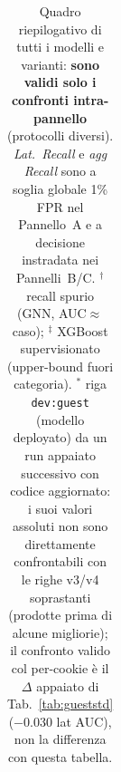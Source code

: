 \begin{table}[ht!]
{\begin{tabular}{l c c c c c c}
    \bottomrule
    \end{tabular}
}
\caption{Quadro riepilogativo di tutti i modelli e varianti: \textbf{sono validi solo i confronti intra-pannello} (protocolli diversi). \textit{Lat.\ Recall} e \textit{agg Recall} sono a soglia globale 1\% FPR nel Pannello~A e a decisione instradata nei Pannelli~B/C. $^{\dagger}$ recall spurio (GNN, AUC$\approx$caso); $^{\ddagger}$ XGBoost supervisionato (upper-bound fuori categoria). $^{\ast}$ riga \texttt{dev:guest} (modello deployato) da un run appaiato successivo con codice aggiornato: i suoi valori assoluti non sono direttamente confrontabili con le righe v3/v4 soprastanti (prodotte prima di alcune migliorie); il confronto valido col per-cookie è il $\Delta$ appaiato di Tab.~\ref{tab:gueststd} ($-0.030$ lat AUC), non la differenza con questa tabella.}
\label{tab:summary}
\end{table}
